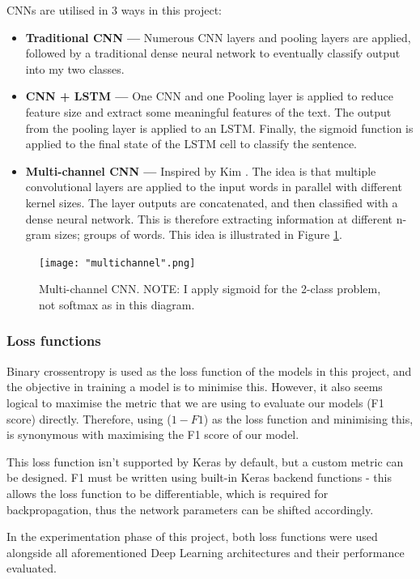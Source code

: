 \documentclass[12pt,a4paper]{article}
\begin{document}
	CNNs are utilised in 3 ways in this project:
	\begin{itemize}
		\item \textbf{Traditional CNN --- }Numerous CNN layers and pooling layers are applied, followed by a traditional dense neural network to eventually classify output into my two classes.
		\item \textbf{CNN + LSTM --- }One CNN and one Pooling layer is applied to reduce feature size and extract some meaningful features of the text. The output from the pooling layer is applied to an LSTM. Finally, the sigmoid function is applied to the final state of the LSTM cell to classify the sentence.
		\item \textbf{Multi-channel CNN --- }Inspired by Kim \citeyear{Kim}. The idea is that multiple convolutional layers are applied to the input words in parallel with different kernel sizes. The layer outputs are concatenated, and then classified with a dense neural network. This is therefore extracting information at different n-gram sizes; groups of words. This idea is illustrated in Figure \ref{multichannel}.
	\end{itemize}

	\begin{figure}[h]
		\centering
		\label{multichannel}
		\texttt{[image: "multichannel".png]}
		\caption{Multi-channel CNN. NOTE: I apply sigmoid for the 2-class problem, not softmax as in this diagram.}
	\end{figure}

	\subsubsection{Loss functions}
	Binary crossentropy is used as the loss function of the models in this project, and the objective in training a model is to minimise this. However, it also seems logical to maximise the metric that we are using to evaluate our models (F1 score) directly. Therefore, using ($1-F1$) as the loss function and minimising this, is synonymous with maximising the F1 score of our model. 
	
	This loss function isn't supported by Keras by default, but a custom metric can be designed. F1 must be written using built-in Keras backend functions - this allows the loss function to be differentiable, which is required for backpropagation, thus the network parameters can be shifted accordingly.
	
	In the experimentation phase of this project, both loss functions were used alongside all aforementioned Deep Learning architectures and their performance evaluated.
	
\end{document}
